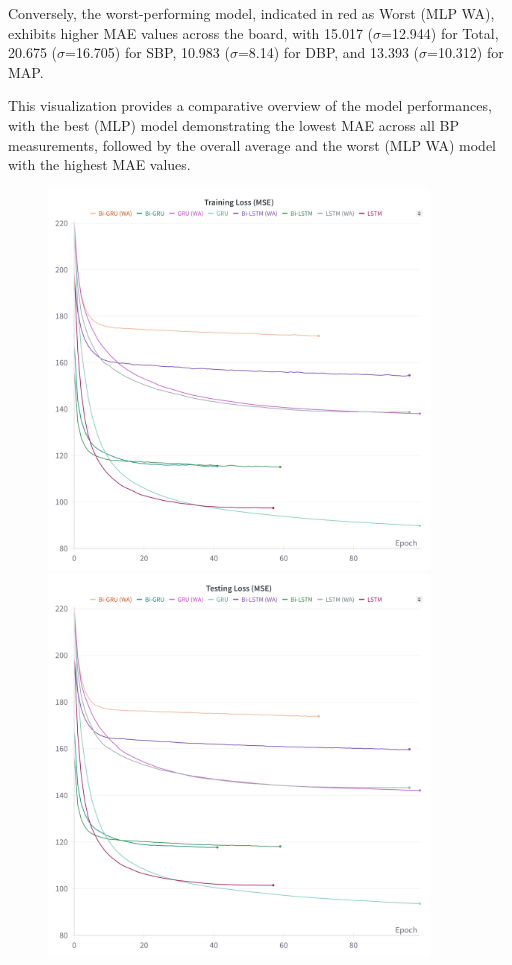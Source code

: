 Conversely, the worst-performing model, indicated in red as Worst (MLP WA), exhibits higher MAE values across the board, with 15.017 ($\sigma$=12.944) for Total,
20.675 ($\sigma$=16.705) for SBP, 10.983 ($\sigma$=8.14) for DBP, and 13.393 ($\sigma$=10.312) for MAP\@.

This visualization provides a comparative overview of the model performances, with the best (MLP) model demonstrating the lowest MAE across all BP measurements,
followed by the overall average and the worst (MLP WA) model with the highest MAE values.

\begin{figure}[p]
    \centering
    \begin{minipage}{\textwidth}
        \vspace{-2cm}
        \centering
        \includegraphics[width=0.9\textwidth]{images/results/training_loss_mse}
        \vspace{0.001cm}
        \includegraphics[width=0.9\textwidth]{images/results/testing_loss_mse}

\end{minipage}
\end{figure}
